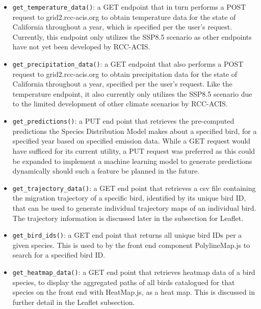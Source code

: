 \documentclass{article}
\begin{document}
\begin{itemize}
	\item \texttt{get\_temperature\_data()}: a GET endpoint that in turn performs a POST request to grid2.rcc-acis.org to obtain temperature data for the state of California throughout a year, which is specified per the user's request. Currently, this endpoint only utilizes the SSP8.5 scenario as other endpoints have not yet been developed by RCC-ACIS.
   	 \item \texttt{get\_precipitation\_data()}: a GET endpoint that also performs a POST request to grid2.rcc-acis.org to obtain precipitation data for the state of California throughout a year, specified per the user's request. Like the temperature endpoint, it also currently only utilizes the SSP8.5 scenario due to the limited development of other climate scenarios by RCC-ACIS.
	\item \texttt{get\_predictions()}: a PUT end point that retrieves the pre-computed predictions the Species Distribution Model makes about a specified bird, for a specified year based on specified emission data. While a GET request would have sufficed for its current utility, a PUT request was preferred as this could be expanded to implement a machine learning model to generate predictions dynamically should such a feature be planned in the future.
	\item \texttt{get\_trajectory\_data()}: a GET end point that retrieves a csv file containing the migration trajectory of a specific bird, identified by its unique bird ID, that can be used to generate individual trajectory maps of an individual bird. The trajectory information is discussed later in the subsection for Leaflet.
	\item \texttt{get\_bird\_ids()}: a GET end point that returns all unique bird IDs per a given species. This is used to by the front end component PolylineMap.js to search for a specified bird ID.
	\item \texttt{get\_heatmap\_data()}: a GET end point that retrieves heatmap data of a bird species, to display the aggregated paths of all birds catalogued for that species on the front end with HeatMap.js, as a heat map. This is discussed in further detail in the Leaflet subsection.
\end{itemize}
\end{document}
